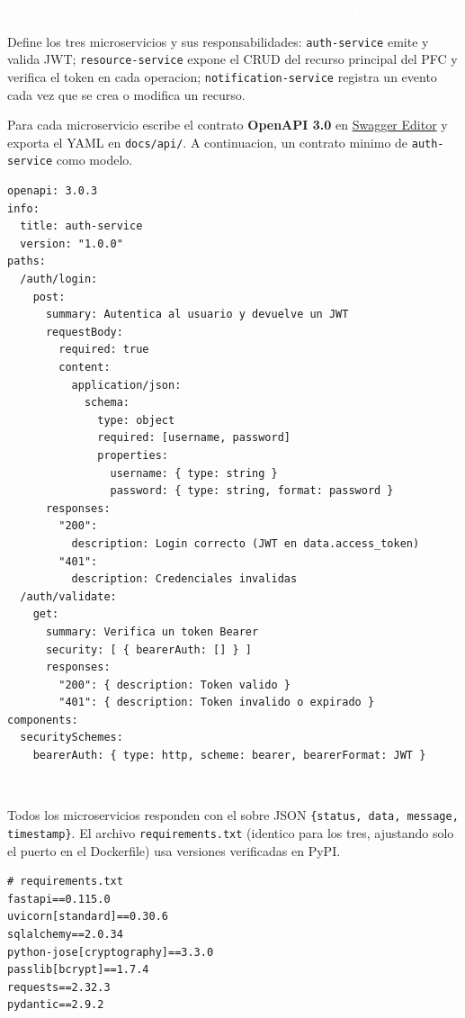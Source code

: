 \documentclass[11pt]{article}
\newcommand{\pasohead}[2]{%
\vspace{4pt}%
\begin{tcolorbox}[colback=azulMedio,colframe=azulMedio,boxrule=0pt,arc=2pt,left=8pt,right=8pt,top=4pt,bottom=4pt]
\textcolor{white}{\textbf{Paso #1.\ \ #2}}\end{tcolorbox}}
\begin{document}
\pasohead{1}{Diseno de la arquitectura y contratos OpenAPI}
Define los tres microservicios y sus responsabilidades: \texttt{auth-service} emite y valida JWT; \texttt{resource-service} expone el CRUD del recurso principal del PFC y verifica el token en cada operacion; \texttt{notification-service} registra un evento cada vez que se crea o modifica un recurso.

Para cada microservicio escribe el contrato \textbf{OpenAPI 3.0} en \href{https://editor.swagger.io}{Swagger Editor} y exporta el YAML en \texttt{docs/api/}. A continuacion, un contrato minimo de \texttt{auth-service} como modelo.

\begin{lstlisting}[language=yamlx]
openapi: 3.0.3
info:
  title: auth-service
  version: "1.0.0"
paths:
  /auth/login:
    post:
      summary: Autentica al usuario y devuelve un JWT
      requestBody:
        required: true
        content:
          application/json:
            schema:
              type: object
              required: [username, password]
              properties:
                username: { type: string }
                password: { type: string, format: password }
      responses:
        "200":
          description: Login correcto (JWT en data.access_token)
        "401":
          description: Credenciales invalidas
  /auth/validate:
    get:
      summary: Verifica un token Bearer
      security: [ { bearerAuth: [] } ]
      responses:
        "200": { description: Token valido }
        "401": { description: Token invalido o expirado }
components:
  securitySchemes:
    bearerAuth: { type: http, scheme: bearer, bearerFormat: JWT }
\end{lstlisting}

\pasohead{2}{Implementacion de los microservicios (FastAPI)}
Todos los microservicios responden con el sobre JSON \texttt{\{status, data, message, timestamp\}}. El archivo \texttt{requirements.txt} (identico para los tres, ajustando solo el puerto en el Dockerfile) usa versiones verificadas en PyPI.

\begin{lstlisting}
# requirements.txt
fastapi==0.115.0
uvicorn[standard]==0.30.6
sqlalchemy==2.0.34
python-jose[cryptography]==3.3.0
passlib[bcrypt]==1.7.4
requests==2.32.3
pydantic==2.9.2
\end{lstlisting}
\end{document}
